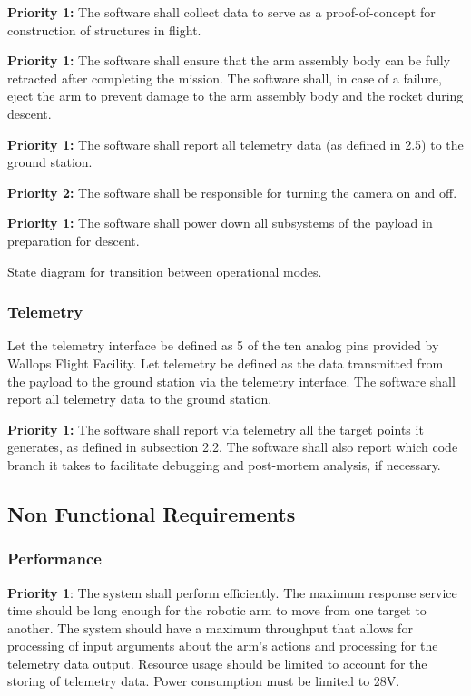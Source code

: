 \textbf{Priority 1:}
The software shall collect data to serve as a proof-of-concept for construction of structures in flight.

\textbf{Priority 1:}
The software shall ensure that the arm assembly body can be fully retracted after completing the mission.
The software shall, in case of a failure, eject the arm to prevent damage to the arm assembly body and the rocket during descent.

\textbf{Priority 1:}
The software shall report all telemetry data (as defined in 2.5) to the ground station.

\textbf{Priority 2:}
The software shall be responsible for turning the camera on and off.

\textbf{Priority 1:}
The software shall power down all subsystems of the payload in preparation for descent.


\begin{center}
State diagram for transition between operational modes.
\end{center}

\subsubsection{Telemetry}
Let the telemetry interface be defined as 5 of the ten analog pins provided by Wallops Flight Facility.
Let telemetry be defined as the data transmitted from the payload to the ground station via the telemetry interface.
The software shall report all telemetry data to the ground station.

\textbf{Priority 1:}
The software shall report via telemetry all the target points it generates, as defined in subsection 2.2.
The software shall also report which code branch it takes to facilitate debugging and post-mortem analysis, if necessary. 

\subsection{Non Functional Requirements}
\subsubsection{Performance}
\textbf{Priority 1}: The system shall perform efficiently. The maximum response service time should be long enough for the robotic arm to move from one target to another.
 The system should have a maximum throughput that allows for processing of input arguments about the arm's actions and processing for the telemetry data output. 
 Resource usage should be limited to account for the storing of telemetry data. Power consumption must be limited to 28V.
